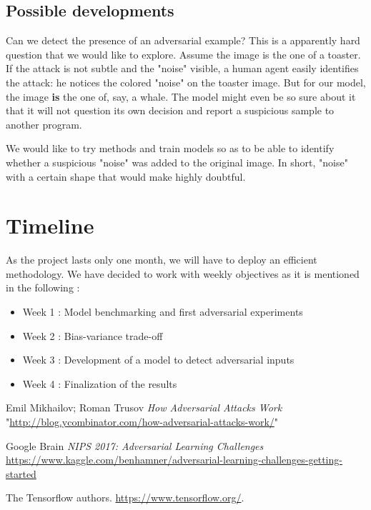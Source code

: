 \documentclass{article}
\begin{document}
\subsection{Possible developments}
Can we detect the presence of an adversarial example?
This is a apparently hard question that we would like to explore. Assume the image is the one of a toaster. If the attack is not subtle and the "noise" visible, a human agent easily identifies the attack: he notices the colored "noise" on the toaster image. But for our model, the image \textbf{is} the one of, say, a whale. The model might even be so sure about it that it will not question its own decision and report a suspicious sample to another program.

We would like to try methods and train models so as to be able to identify whether a suspicious "noise" was added to the original image. In short, "noise" with a certain shape that would make highly doubtful.

\section{Timeline}

As the project lasts only one month, we will have to deploy an efficient methodology. We have decided to work with weekly objectives as it is mentioned in the following :
\begin{itemize}
    \item Week 1 : Model benchmarking and first adversarial experiments
    \item Week 2 : Bias-variance trade-off
    \item Week 3 : Development of a model to detect adversarial inputs
    \item Week 4 : Finalization of the results
\end{itemize}



\begin{thebibliography}{1}

     Emil Mikhailov; Roman Trusov {\em How Adversarial Attacks Work} 
  "\url{http://blog.ycombinator.com/how-adversarial-attacks-work/}"
  
     Google Brain {\em NIPS 2017: Adversarial Learning Challenges} 
    \newline
    \url{https://www.kaggle.com/benhamner/adversarial-learning-challenges-getting-started}
    
    The Tensorflow authors.
    \url{https://www.tensorflow.org/}.

  \end{thebibliography}

\listoffigures
\end{document}
